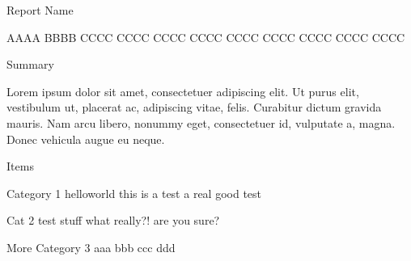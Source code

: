 \documentclass[11pt,letterpaper]{article}
\begin{document}
\textsf{\textcolor{customlightblue}{\Large{Report Name}}}

\smallskip

\normalsize{AAAA} \hfill
\normalsize{BBBB} \hfill
\normalsize{CCCC CCCC CCCC CCCC CCCC CCCC CCCC CCCC CCCC}

\bigskip
\medskip


\textsf{\textcolor{customlightblue}{\Large{Summary}}}  %

\smallskip

\normalsize{Lorem ipsum dolor sit amet, consectetuer adipiscing elit. Ut purus elit, vestibulum ut, placerat ac, adipiscing vitae, felis. Curabitur dictum gravida mauris. Nam arcu libero, nonummy eget, consectetuer id, vulputate a, magna. Donec vehicula augue eu neque.} %

\bigskip
\medskip

\textsf{\textcolor{customlightblue}{\Large{Items}}}  %

\smallskip




\begin{description*}
    \item[Category 1] \hfill
    helloworld \hfill
    this is a test \hfill
    a \hfill
    real \hfill
    good test
    \item[Cat 2] \hfill
    test \hfill
    stuff \hfill
    what \hfill
    really?! are you sure?
    \item[More Category 3] \hfill
    aaa \hfill
    bbb \hfill
    ccc \hfill
    ddd
\end{description*}



\bigskip
\medskip

\end{document}
